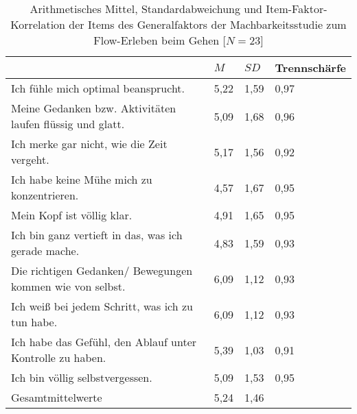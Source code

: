\begin{table}
	[!htb] \centering \caption[Item-Faktor-Korrelation der Items des Generalfaktors (Gehstudie -- intraindividuell)]{Arithmetisches Mittel, Standardabweichung und Item-Faktor-Korrelation der Items des Generalfaktors der Machbarkeitsstudie zum Flow-Erleben beim Gehen [$N = 23$]} \label{tab:generalfaktor_2} 
	\begin{tabularx}
		{ 
		\textwidth}{p{} p{} p{} p{}} \toprule & $M$ & $SD$ & Trennschärfe \\
		\midrule Ich fühle mich optimal beansprucht. & 5,22 & 1,59 & 0,97 \\
		Meine Gedanken bzw. Aktivitäten laufen flüssig und glatt. & 5,09 & 1,68 & 0,96 \\
		Ich merke gar nicht, wie die Zeit vergeht. & 5,17 & 1,56 & 0,92 \\
		Ich habe keine Mühe mich zu konzentrieren. & 4,57 & 1,67 & 0,95 \\
		Mein Kopf ist völlig klar. & 4,91 & 1,65 & 0,95 \\
		Ich bin ganz vertieft in das, was ich gerade mache. & 4,83 & 1,59 & 0,93 \\
		Die richtigen Gedanken/ Bewegungen kommen wie von selbst. & 6,09 & 1,12 & 0,93 \\
		Ich weiß bei jedem Schritt, was ich zu tun habe. & 6,09 & 1,12 & 0,93 \\
		Ich habe das Gefühl, den Ablauf unter Kontrolle zu haben. & 5,39 & 1,03 & 0,91 \\
		Ich bin völlig selbstvergessen. & 5,09 & 1,53 & 0,95 \\
		Gesamtmittelwerte & 5,24 & 1,46 & \\
		\bottomrule 
	\end{tabularx}
\end{table}
